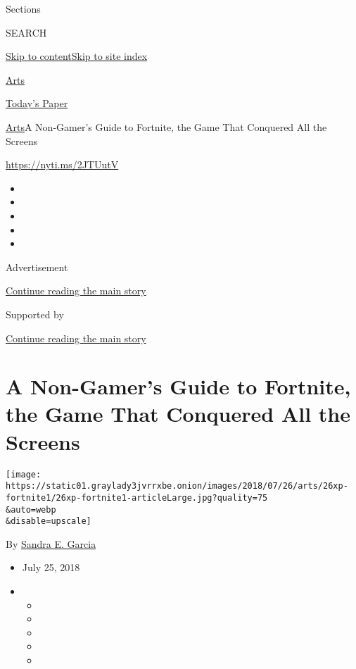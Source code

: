 Sections

SEARCH

\protect\hyperlink{site-content}{Skip to
content}\protect\hyperlink{site-index}{Skip to site index}

\href{https://www.nytimes3xbfgragh.onion/section/arts}{Arts}

\href{https://myaccount.nytimes3xbfgragh.onion/auth/login?response_type=cookie\&client_id=vi}{}

\href{https://www.nytimes3xbfgragh.onion/section/todayspaper}{Today's
Paper}

\href{/section/arts}{Arts}\textbar{}A Non-Gamer's Guide to Fortnite, the
Game That Conquered All the Screens

\url{https://nyti.ms/2JTUutV}

\begin{itemize}
\item
\item
\item
\item
\item
\end{itemize}

Advertisement

\protect\hyperlink{after-top}{Continue reading the main story}

Supported by

\protect\hyperlink{after-sponsor}{Continue reading the main story}

\hypertarget{a-non-gamers-guide-to-fortnite-the-game-that-conquered-all-the-screens}{%
\section{A Non-Gamer's Guide to Fortnite, the Game That Conquered All
the
Screens}\label{a-non-gamers-guide-to-fortnite-the-game-that-conquered-all-the-screens}}

\texttt{[image: https://static01.graylady3jvrrxbe.onion/images/2018/07/26/arts/26xp-fortnite1/26xp-fortnite1-articleLarge.jpg?quality=75\\\&auto=webp\\\&disable=upscale]}

By \href{https://www.nytimes3xbfgragh.onion/by/sandra-e-garcia}{Sandra
E. Garcia}

\begin{itemize}
\item
  July 25, 2018
\item
  \begin{itemize}
  \item
  \item
  \item
  \item
  \item
  \end{itemize}
\end{itemize}


